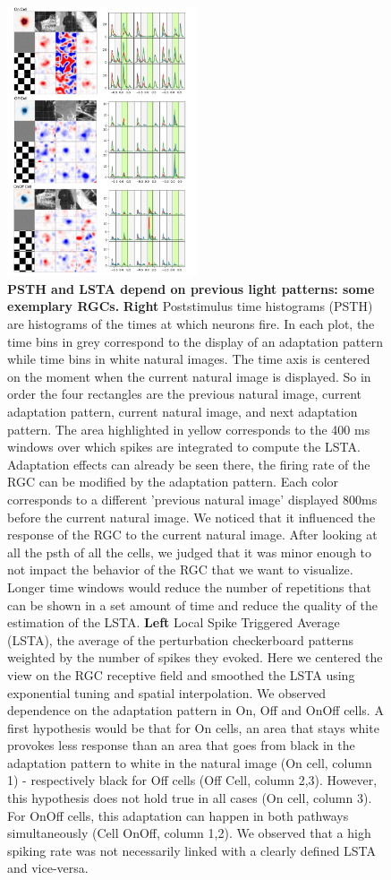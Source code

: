 \begin{figure}
    \centering
    \includegraphics[width=0.5\textwidth]{pics/ExamplePSTHLSTA.png}
    \caption{\textbf{PSTH and LSTA depend on previous light patterns: some exemplary RGCs.} \small\textbf{Right} Poststimulus time histograms (PSTH) are histograms of the times at which neurons fire. In each plot, the time bins in grey correspond to the display of an adaptation pattern while time bins in white natural images.
        The time axis is centered on the moment when the current natural image is displayed. So in order the four rectangles are the previous natural image, current adaptation pattern, current natural image, and next adaptation pattern. The area highlighted in yellow corresponds to the 400 ms windows over which spikes are integrated to compute the LSTA. Adaptation effects can already be seen there, the firing rate of the RGC can be modified by the adaptation pattern.
        Each color corresponds to a different 'previous natural image' displayed 800ms before the current natural image. We noticed that it influenced the response of the RGC to the current natural image. After looking at all the psth of all the cells, we judged that it was minor enough to not impact the behavior of the RGC that we want to visualize. Longer time windows would reduce the number of repetitions that can be shown in a set amount of time and reduce the quality of the estimation of the LSTA.
        \textbf{Left} Local Spike Triggered Average (LSTA), the average of the perturbation checkerboard patterns weighted by the number of spikes they evoked. Here we centered the view on the RGC receptive field and smoothed the LSTA using exponential tuning and spatial interpolation. We observed dependence on the adaptation pattern in On, Off and OnOff cells. A first hypothesis would be that for On cells, an area that stays white provokes less response than an area that goes from black in the adaptation pattern to white in the natural image (On cell, column 1) - respectively black for Off cells (Off Cell, column 2,3).
        However, this hypothesis does not hold true in all cases (On cell, column 3). For OnOff cells, this adaptation can happen in both pathways simultaneously (Cell OnOff, column 1,2). We observed that a high spiking rate was not necessarily linked with a clearly defined LSTA and vice-versa. }
    \label{fig:CellExample}
\end{figure}

